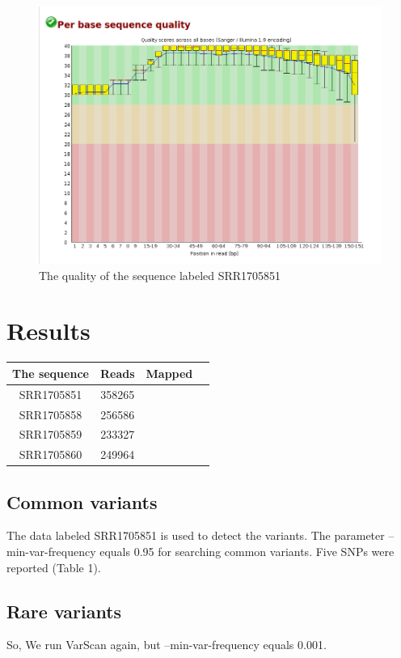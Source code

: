 \documentclass{article}
\begin{document}
\begin{figure}[h]
\centering
\includegraphics[scale=0.35]{data_q.png} 
 
\caption{ The quality of the sequence labeled SRR1705851  }
\label{saw}
\end{figure}

\section{Results}

	\begin{table} 
	\centering
	\begin{tabular}{|c|c|c|c|}
		\hline
		The sequence & Reads & Mapped \\
		\hline
		SRR1705851 & 358265 & \\
		\hline
		SRR1705858 & 256586 & \\
		\hline
		SRR1705859 & 233327 & \\
		\hline
		SRR1705860 & 249964  & \\
		\hline
	\end{tabular}
\end{table}
 
\subsection{Common variants}
The  data labeled SRR1705851 is used to detect the variants.  The parameter --min-var-frequency equals 0.95 for searching common variants.  Five SNPs were reported (Table 1). 

\subsection{Rare variants}
 So, We run VarScan again, but --min-var-frequency equals 0.001. %
\end{document}
